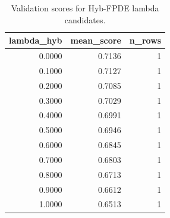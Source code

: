 \begin{table}[t]
\caption{Validation scores for Hyb-FPDE lambda candidates.}
\label{tab:lambda_distribution_computed}
\centering
\begin{tabular}{rrr}
\toprule
lambda\_hyb & mean\_score & n\_rows \\
\midrule
0.0000 & 0.7136 & 1 \\
0.1000 & 0.7127 & 1 \\
0.2000 & 0.7085 & 1 \\
0.3000 & 0.7029 & 1 \\
0.4000 & 0.6991 & 1 \\
0.5000 & 0.6946 & 1 \\
0.6000 & 0.6845 & 1 \\
0.7000 & 0.6803 & 1 \\
0.8000 & 0.6713 & 1 \\
0.9000 & 0.6612 & 1 \\
1.0000 & 0.6513 & 1 \\
\bottomrule
\end{tabular}

\end{table}
